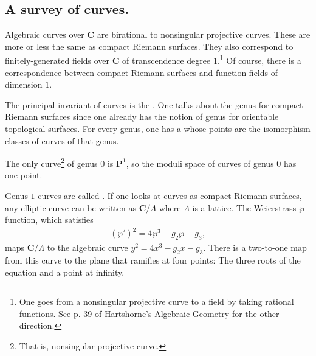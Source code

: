 \documentclass [11 pt, oneside] {article}
\begin{document}
\subsection{A survey of curves.}
Algebraic curves over $\mathbf{C}$ are birational to nonsingular projective curves. These are more or less the same as compact Riemann surfaces. They also correspond to finitely-generated fields over $\mathbf{C}$ of transcendence degree $1$.\footnote{One goes from a nonsingular projective curve to a field by taking rational functions. See p. 39 of Hartshorne's \ul{Algebraic Geometry} for the other direction.} Of course, there is a correspondence between compact Riemann surfaces and function fields of dimension $1$.

The principal invariant of curves is the . One talks about the genus for compact Riemann surfaces since one already has the notion of genus for orientable topological surfaces. For every genus, one has a  whose points are the isomorphism classes of curves of that genus.

The only curve\footnote{That is, nonsingular projective curve.} of genus $0$ is $\mathbf{P}^1$, so the moduli space of curves of genus $0$ has one point.

Genus-$1$ curves are called . If one looks at curves as compact Riemann surfaces, any elliptic curve can be written as $\mathbf{C}/\Lambda$ where $\Lambda$ is a lattice. The Weierstrass $\wp$ function, which satisfies
\begin{align*}
	(\wp') ^2 = 4\wp^3 -g_2\wp-g_3,
\end{align*}
maps $\mathbf{C}/\Lambda$ to the algebraic curve $y^2=4x^3-g_2x-g_3$. There is a two-to-one map from this curve to the plane that ramifies at four points: The three roots of the equation and a point at infinity.
\end{document}
